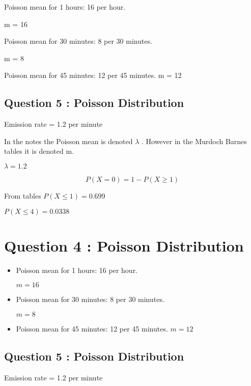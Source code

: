 \documentclass[a4paper,12pt]{article}
\begin{document}
Poisson mean for 1 hours: 16 per hour.

m = 16

Poisson mean for 30 minutes: 8 per 30 minutes.

m = 8

Poisson mean for 45 minutes: 12 per 45 minutes. 
m = 12

\subsection{Question 5 : Poisson Distribution}

Emission rate = 1.2 per minute

In the notes the Poisson mean is denoted $\lambda$ . However in the Murdoch Barnes tables it is denoted m.

$\lambda = 1.2$




\[P(X=0) = 1 - P(X\geq 1)\]

From tables $P(X \leq 1) = 0.699$


$P(X \leq 4) = 0.0338 $


\section{Question 4 : Poisson Distribution}

\begin{itemize}
	\item Poisson mean for 1 hours: 16 per hour.
	
	$m = 16$
	
	\item Poisson mean for 30 minutes: 8 per 30 minutes.
	
	$m = 8$
	
	\item Poisson mean for 45 minutes: 12 per 45 minutes. 
	$m = 12$
\end{itemize}





\subsection{Question 5 : Poisson Distribution}

Emission rate = 1.2 per minute
\end{document}
